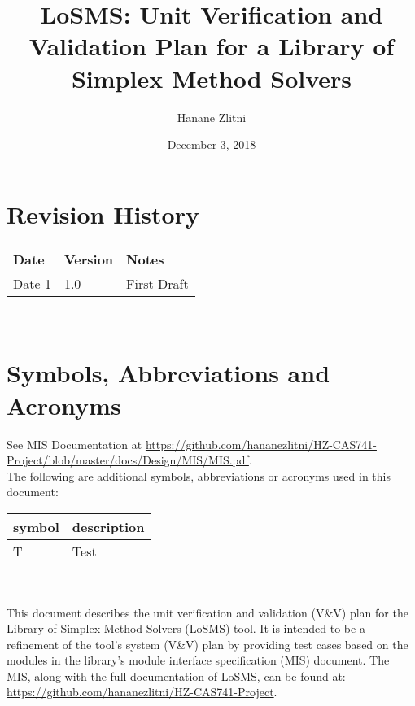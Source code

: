 \documentclass[12pt, titlepage]{article}
\newcommand{\progname}{Library of Simplex Method Solvers}
\newcommand{\famname}{LoSMS}
\begin{document}
\title{\famname{}: Unit Verification and Validation Plan for a \progname{}} 
\author{Hanane Zlitni}
\date{December 3, 2018}
	
\maketitle


\section{Revision History}

\begin{tabularx}{\textwidth}{p{3cm}p{2cm}X}
\toprule {\bf Date} & {\bf Version} & {\bf Notes}\\
\midrule
Date 1 & 1.0 & First Draft\\
\bottomrule
\end{tabularx}

~\newpage

\tableofcontents

\listoftables

\newpage

\section{Symbols, Abbreviations and Acronyms}

See MIS Documentation at 
\url{https://github.com/hananezlitni/HZ-CAS741-Project/blob/master/docs/Design/MIS/MIS.pdf}.
\\

The following are additional symbols, abbreviations or acronyms used in this 
document: \\

\renewcommand{\arraystretch}{1.2}
\begin{tabular}{l l} 
  \toprule		
  \textbf{symbol} & \textbf{description}\\
  \midrule 
  T & Test\\
  \bottomrule
\end{tabular}\\

\newpage


This document describes the unit verification and validation (V\&V) plan for
the Library of Simplex Method Solvers (\famname{}) tool. It is intended to be a 
refinement of the tool's system (V\&V) plan by providing test cases based on 
the modules in the library's module interface specification (MIS) document. The 
MIS, along with the full documentation of \famname{}, can be found at: 
\url{https://github.com/hananezlitni/HZ-CAS741-Project}.
\end{document}

